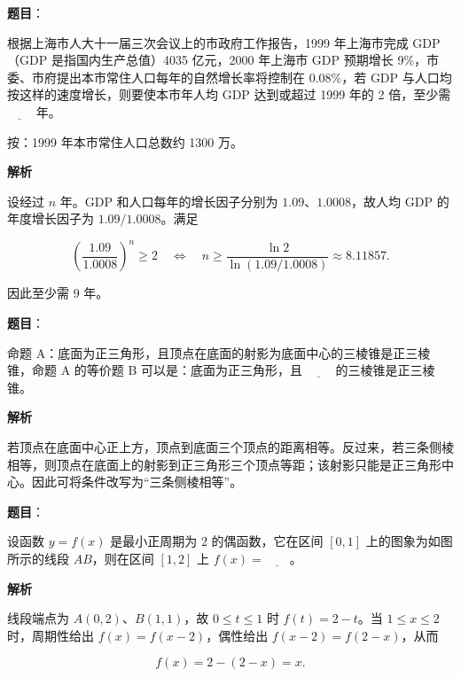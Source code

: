 \begin{answer}

\textbf{题目}：

根据上海市人大十一届三次会议上的市政府工作报告，1999 年上海市完成 GDP（GDP 是指国内生产总值）4035 亿元，2000 年上海市 GDP 预期增长 9\%，市委、市府提出本市常住人口每年的自然增长率将控制在 0.08\%，若 GDP 与人口均按这样的速度增长，则要使本市年人均 GDP 达到或超过 1999 年的 2 倍，至少需 $\underline{\qquad}$ 年。

按：1999 年本市常住人口总数约 1300 万。

\textbf{解析}

设经过 $n$ 年。GDP 和人口每年的增长因子分别为 $1.09$、$1.0008$，故人均 GDP 的年度增长因子为 $1.09/1.0008$。满足

\nopagebreak[4]
\[
\left(\frac{1.09}{1.0008}\right)^n\geq2
\quad\Longleftrightarrow\quad
n\geq\frac{\ln2}{\ln(1.09/1.0008)}\approx8.11857.
\]

因此至少需 $9$ 年。


\end{answer}
\begin{answer}

\textbf{题目}：

命题 A：底面为正三角形，且顶点在底面的射影为底面中心的三棱锥是正三棱锥，命题 A 的等价题 B 可以是：底面为正三角形，且 $\underline{\qquad}$ 的三棱锥是正三棱锥。

\textbf{解析}

若顶点在底面中心正上方，顶点到底面三个顶点的距离相等。反过来，若三条侧棱相等，则顶点在底面上的射影到正三角形三个顶点等距；该射影只能是正三角形中心。因此可将条件改写为“三条侧棱相等”。


\end{answer}
\begin{answer}

\textbf{题目}：

设函数 $y=f(x)$ 是最小正周期为 2 的偶函数，它在区间 $[0,1]$ 上的图象为如图所示的线段 $AB$，则在区间 $[1,2]$ 上 $f(x)=\underline{\qquad}$。
\nopagebreak[4]
\begin{center}\end{center}
\nopagebreak[4]
\textbf{解析}

线段端点为 $A(0,2)$、$B(1,1)$，故 $0\leq t\leq1$ 时 $f(t)=2-t$。当 $1\leq x\leq2$ 时，周期性给出 $f(x)=f(x-2)$，偶性给出 $f(x-2)=f(2-x)$，从而

\nopagebreak[4]
\[
f(x)=2-(2-x)=x.
\]


\end{answer}
